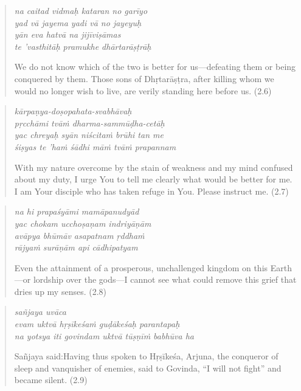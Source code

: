 \documentclass[12pt, twoside, openright]{memoir}
\begin{document}
\par
\begin{verse}
\textit{na caitad vidmaḥ kataran no garīyo} \\
\textit{yad vā jayema yadi vā no jayeyuḥ} \\
\textit{yān eva hatvā na jijīviṣāmas} \\
\textit{te ’vasthitāḥ pramukhe dhārtarāṣṭrāḥ}

\noindent We do not know which of the two is better for us---defeating them or being conquered by them. Those sons of Dhṛtarāṣṭra, after killing whom we would no longer wish to live, are verily standing here before us. (2.6)
\end{verse}
\par



\par
\begin{verse}
\textit{kārpaṇya-doṣopahata-svabhāvaḥ} \\
\textit{pṛcchāmi tvāṁ dharma-sammūḍha-cetāḥ} \\
\textit{yac chreyaḥ syān niścitaṁ brūhi tan me} \\
\textit{śiṣyas te ’haṁ śādhi māṁ tvāṁ prapannam}

\noindent With my nature overcome by the stain of weakness and my mind confused about my duty, I urge You to tell me clearly what would be better for me. I am Your disciple who has taken refuge in You. Please instruct me. (2.7)
\end{verse}
\par



\par
\begin{verse}
\textit{na hi prapaśyāmi mamāpanudyād} \\
\textit{yac chokam ucchoṣaṇam indriyāṇām} \\
\textit{avāpya bhūmāv asapatnam ṛddhaṁ} \\
\textit{rājyaṁ surāṇām api cādhipatyam}

\noindent Even the attainment of a prosperous, unchallenged kingdom on this Earth---or lordship over the gods---I cannot see what could remove this grief that dries up my senses. (2.8)
\end{verse}
\par



\par
\begin{verse}
\textit{sañjaya uvāca} \\
\textit{evam uktvā hṛṣīkeśaṁ guḍākeśaḥ parantapaḥ} \\
\textit{na yotsya iti govindam uktvā tūṣṇīṁ babhūva ha}

\noindent \quad Sañjaya said:\linebreak Having thus spoken to Hṛṣīkeśa, Arjuna, the conqueror of sleep and vanquisher of enemies, said to Govinda, \enquote{I will not fight} and became silent. (2.9)
\end{verse}
\par
\end{document}
